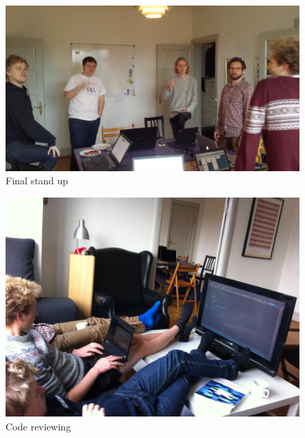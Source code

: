 \begin{figure}[h]
\begin{center}
\includegraphics[scale=0.1]{img/SCRUM/standUp2.jpg}
\caption{Final stand up}
\label{fig:Stand Up 2}
\end{center}
\end{figure}

\begin{figure}[h]
\begin{center}
\includegraphics[scale=0.1]{img/SCRUM/codeReview.jpg}
\caption{Code reviewing}
\label{fig:Code review}
\end{center}
\end{figure}
      
             
